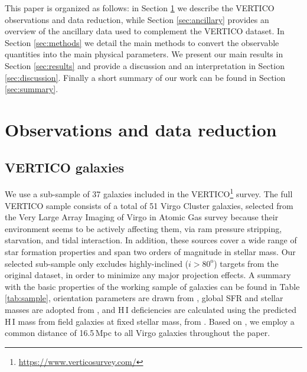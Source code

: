 \documentclass[longauth]{aa}
\begin{document}
This paper is organized as follows: in Section \ref{sec:data} we describe the VERTICO observations and data reduction, while Section \ref{sec:ancillary} provides an overview of the ancillary data used to complement the VERTICO dataset. In Section \ref{sec:methods} we detail the main methods to convert the observable quantities into the main physical parameters. We present our main results in Section \ref{sec:results} and provide a discussion and an interpretation in Section \ref{sec:discussion}. Finally a short summary of our work can be found in Section \ref{sec:summary}.


\section{Observations and data reduction}
\label{sec:data}
\subsection{VERTICO galaxies}
We use a sub-sample of 37 galaxies included in the VERTICO\footnote{\url{https://www.verticosurvey.com/}} \citep{Brown2021} survey. The full VERTICO sample consists of a total of 51 Virgo Cluster galaxies, selected from the Very Large Array Imaging of Virgo in Atomic Gas survey \citep[VIVA,][]{Chung2009} because their environment seems to be actively affecting them, via ram pressure stripping, starvation, and tidal interaction. In addition, these sources cover a wide range of star formation properties and span two orders of magnitude in stellar mass. Our selected sub-sample only excludes highly-inclined ($i > 80^\mathrm{o}$) targets from the original dataset, in order to minimize any major projection effects. A summary with the basic properties of the working sample of galaxies can be found in Table \ref{tab:sample}, orientation parameters are drawn from \citet{Brown2021}, global SFR and stellar masses are adopted from \citet{Leroy2019}, and H\,I deficiencies are calculated using the predicted H\,I mass from field galaxies at fixed stellar mass, from \citet{Zabel2022}. Based on \citet{Mei2007}, we employ a common distance of 16.5\,Mpc to all Virgo galaxies throughout the paper.
\end{document}
